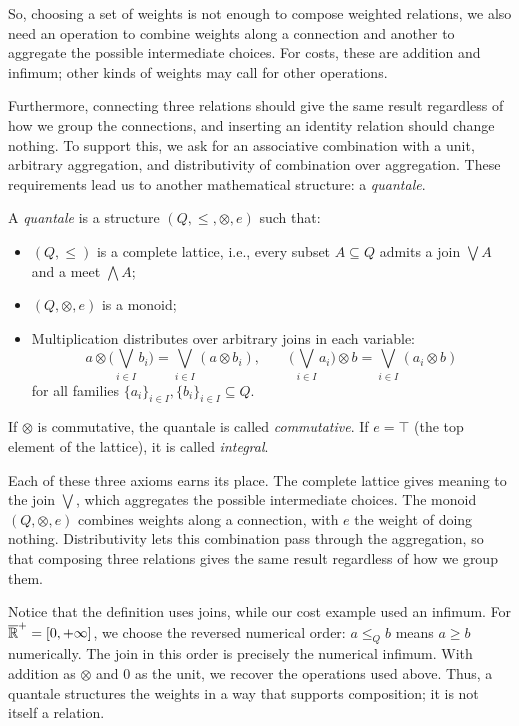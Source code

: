 So, choosing a set of weights is not enough to compose weighted relations,
we also need an operation to combine weights along a connection and another
to aggregate the possible intermediate choices.
For costs, these are addition and infimum; other kinds
of weights may call for other operations.

Furthermore, connecting three relations should give the same result regardless
of how we group the connections, and inserting an identity relation should
change nothing. To support this, we ask for an associative combination with
a unit, arbitrary aggregation, and distributivity of combination over
aggregation. These requirements lead us to another mathematical structure:
a \emph{quantale}.

\begin{definition}[Quantale]
	A \emph{quantale} is a structure $(Q,\leq,\otimes,e)$ such that:

	\begin{itemize}
		\item $(Q,\leq)$ is a complete lattice, i.e., every subset $A \subseteq Q$ admits a join $\bigvee A$ and a meet $\bigwedge A$;
		\item $(Q,\otimes,e)$ is a monoid;
		\item Multiplication distributes over arbitrary joins in each variable:
		      \[
			      a \otimes \Big( \bigvee_{i \in I} b_i \Big)
			      =
			      \bigvee_{i \in I} (a \otimes b_i),
			      \qquad
			      \Big( \bigvee_{i \in I} a_i \Big) \otimes b
			      =
			      \bigvee_{i \in I} (a_i \otimes b)
		      \]
		      for all families $\{a_i\}_{i\in I}, \{b_i\}_{i\in I} \subseteq Q$.
	\end{itemize}

	If $\otimes$ is commutative, the quantale is called \emph{commutative}.
	If $e = \top$ (the top element of the lattice), it is called \emph{integral}.
\end{definition}

Each of these three axioms earns its place. The complete lattice gives
meaning to the join $\bigvee$, which aggregates the possible intermediate
choices. The monoid $(Q,\otimes,e)$ combines weights along a connection,
with $e$ the weight of doing nothing. Distributivity lets this combination
pass through the aggregation, so that composing three relations gives the
same result regardless of how we group them.

Notice that the definition uses joins, while our cost example used an infimum.
For $\overline{\mathbb{R}}^+=[0,+\infty]$, we choose the reversed numerical order:
$a\leq_Q b$ means $a\geq b$ numerically. The join in this order is precisely
the numerical infimum. With addition as $\otimes$ and $0$ as the unit,
we recover the operations used above. Thus, a quantale structures the weights
in a way that supports composition; it is not itself a relation.


